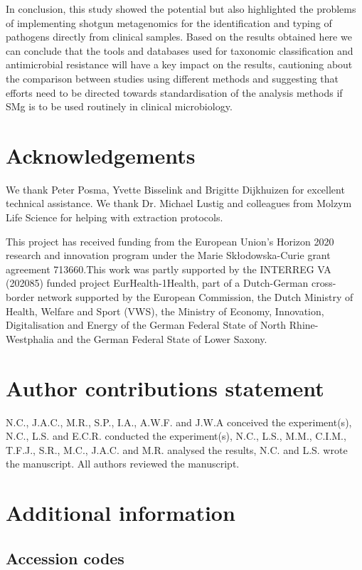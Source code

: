 In conclusion, this study showed the potential but also highlighted the problems of implementing shotgun metagenomics for the identification and typing of pathogens directly from clinical samples. Based on the results obtained here we can conclude that the tools and databases used for taxonomic classification and antimicrobial resistance will have a key impact on the results, cautioning about the comparison between studies using different methods and suggesting that efforts need to be directed towards standardisation of the analysis methods if \ac{SMg} is to be used routinely in clinical microbiology.

\section{Acknowledgements}

We thank Peter Posma, Yvette Bisselink and Brigitte Dijkhuizen for excellent technical assistance. We thank Dr. Michael Lustig and colleagues from Molzym Life Science for helping with extraction protocols.

This project has received funding from the European Union’s Horizon 2020 research and innovation program under the Marie Skłodowska-Curie grant agreement 713660.This work was partly supported by the INTERREG VA (202085) funded project EurHealth-1Health, part of a Dutch-German cross-border network supported by the European Commission, the Dutch Ministry of Health, Welfare and Sport (VWS), the Ministry of Economy, Innovation, Digitalisation and Energy of the German Federal State of North Rhine-Westphalia and the German Federal State of Lower Saxony.

\section{Author contributions statement}

N.C., J.A.C., M.R., S.P., I.A., A.W.F. and J.W.A conceived the experiment(s), N.C., L.S. and E.C.R. conducted the experiment(s), N.C., L.S., M.M., C.I.M., T.F.J., S.R., M.C., J.A.C. and M.R. analysed the results, N.C. and L.S. wrote the manuscript. All authors reviewed the manuscript.

\section{Additional information}

\subsection{Accession codes} \label{ch2_supmaterial}

